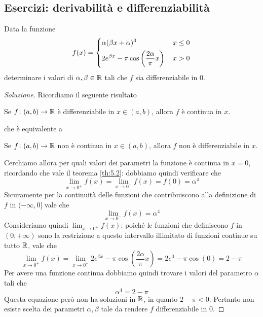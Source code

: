 \subsection{Esercizi: derivabilità e differenziabilità}
\begin{exercise}
    \label{ex:6.1}
    Data la funzione
    \[
    f(x) = \begin{dcases}
        \alpha(\beta x + \alpha)^3\, & x\le 0\\
        2e^{\beta x} - \pi \cos\left(\frac{2\alpha}{\pi} x\right)\, & x>0
    \end{dcases}
    \]
    determinare i valori di $\alpha, \beta \in\amsbb{R}$ tali che $f$ sia differenziabile in 0.
\end{exercise}
\begin{proof}[Soluzione]
    Ricordiamo il seguente risultato
    \begin{tcolorbox}
        \begin{theorem}
            \label{th:6.3}
            Se $f\colon (a,b)\to\amsbb{R}$ è differenziabile in $x\in(a,b)$, allora $f$ è continua in $x$.
        \end{theorem}
    \end{tcolorbox}
    che è equivalente a
    \begin{tcolorbox}
        Se $f\colon (a,b)\to\amsbb{R}$ non è continua in $x\in(a,b)$, allora $f$ non è differenziabile in $x$.
    \end{tcolorbox}
    Cerchiamo allora per quali valori dei parametri la funzione è continua in $x=0$, ricordando che vale il teorema \ref{th:5.2}: dobbiamo quindi verificare che
    \[
    \lim_{x\to 0^+} f(x) = \lim_{x\to 0^-} f(x) = f(0) = \alpha^4
    \]
    Sicuramente per la continuità delle funzioni che contribuiscono alla definizione di $f$ in $(-\infty, 0]$ vale che
    \[
    \lim_{x\to 0^-}f(x) = \alpha^4
    \]
    Consideriamo quindi $\lim_{x\to 0^+} f(x)$: poiché le funzioni che definiscono $f$ in $(0, +\infty)$ sono la restrizione a questo intervallo illimitato di funzioni continue su tutto $\amsbb{R}$, vale che
    \[
    \lim_{x\to 0^+} f(x) = \lim_{x\to 0^+} 2e^{\beta x} - \pi \cos\left(\frac{2\alpha}{\pi} x\right) = 2e^0-\pi \cos(0) = 2-\pi
    \]
    Per avere una funzione continua dobbiamo quindi trovare i valori del parametro $\alpha$ tali che
    \[
    \alpha^4 = 2-\pi
    \]
    Questa equazione però non ha soluzioni in $\amsbb{R}$, in quanto $2-\pi<0$. Pertanto non esiste scelta dei parametri $\alpha,\beta$ tale da rendere $f$ differenziabile in $0$.
\end{proof}
